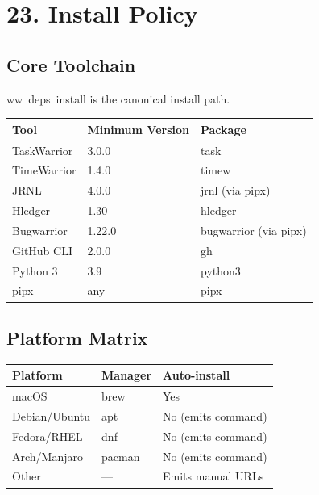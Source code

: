 \documentclass[11pt, a4paper, DIV=14]{scrartcl}
\renewcommand{\texttt}[1]{{\ttfamily\fontsize{8.5}{10.5}\selectfont\color{BabbNavy}#1}}
\newcounter{none}
\begin{document}
\section{23. Install Policy}\label{install-policy}

\subsection{Core Toolchain}\label{core-toolchain}

\texttt{ww\ deps\ install} is the canonical install path.

{\def\LTcaptype{none} %
\begin{longtable}[]{@{}lll@{}}
\toprule\noalign{}
Tool & Minimum Version & Package \\
\midrule\noalign{}
\endhead
\bottomrule\noalign{}
\endlastfoot
TaskWarrior & 3.0.0 & \texttt{task} \\
TimeWarrior & 1.4.0 & \texttt{timew} \\
JRNL & 4.0.0 & \texttt{jrnl} (via pipx) \\
Hledger & 1.30 & \texttt{hledger} \\
Bugwarrior & 1.22.0 & \texttt{bugwarrior} (via pipx) \\
GitHub CLI & 2.0.0 & \texttt{gh} \\
Python 3 & 3.9 & \texttt{python3} \\
pipx & any & \texttt{pipx} \\
\end{longtable}
}

\subsection{Platform Matrix}\label{platform-matrix}

{\def\LTcaptype{none} %
\begin{longtable}[]{@{}lll@{}}
\toprule\noalign{}
Platform & Manager & Auto-install \\
\midrule\noalign{}
\endhead
\bottomrule\noalign{}
\endlastfoot
macOS & brew & Yes \\
Debian/Ubuntu & apt & No (emits command) \\
Fedora/RHEL & dnf & No (emits command) \\
Arch/Manjaro & pacman & No (emits command) \\
Other & --- & Emits manual URLs \\
\end{longtable}
}
\end{document}
